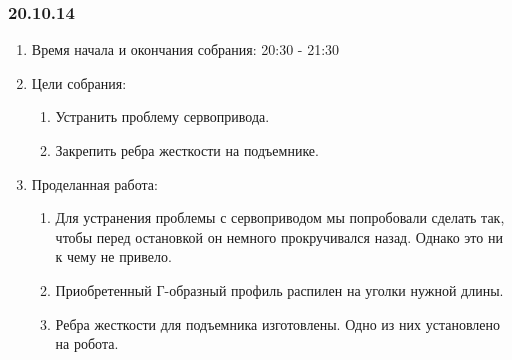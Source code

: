 	
\subsubsection{20.10.14}

\begin{enumerate}
	\item Время начала и окончания собрания:
	20:30 - 21:30
	\item Цели собрания:
	\begin{enumerate}
	  \item Устранить проблему сервопривода.
	  
	  \item Закрепить ребра жесткости на подъемнике.
	  
    \end{enumerate}
    
	\item Проделанная работа:
	\begin{enumerate}
	  \item Для устранения проблемы с сервоприводом мы попробовали сделать так, чтобы перед остановкой он немного прокручивался назад. Однако это ни к чему не привело.
      
      \item Приобретенный Г-образный профиль распилен на уголки нужной длины.
      
      \item Ребра жесткости для подъемника изготовлены. Одно из них установлено на робота.
      

\end{enumerate}
\end{enumerate}
